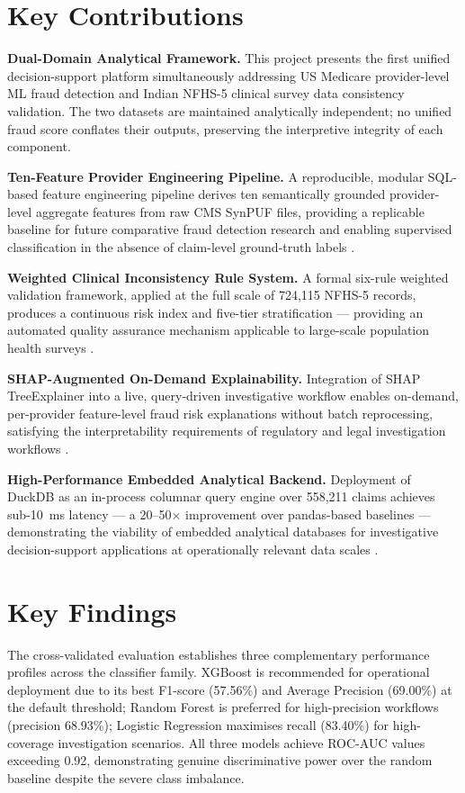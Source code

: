 \section{Key Contributions}

\textbf{Dual-Domain Analytical Framework.} This project presents the first unified decision-support platform simultaneously addressing US Medicare provider-level ML fraud detection and Indian NFHS-5 clinical survey data consistency validation. The two datasets are maintained analytically independent; no unified fraud score conflates their outputs, preserving the interpretive integrity of each component.

\textbf{Ten-Feature Provider Engineering Pipeline.} A reproducible, modular SQL-based feature engineering pipeline derives ten semantically grounded provider-level aggregate features from raw CMS SynPUF files, providing a replicable baseline for future comparative fraud detection research and enabling supervised classification in the absence of claim-level ground-truth labels \cite{b17}.

\textbf{Weighted Clinical Inconsistency Rule System.} A formal six-rule weighted validation framework, applied at the full scale of 724,115 NFHS-5 records, produces a continuous risk index and five-tier stratification --- providing an automated quality assurance mechanism applicable to large-scale population health surveys \cite{b14}\cite{b15}.

\textbf{SHAP-Augmented On-Demand Explainability.} Integration of SHAP TreeExplainer \cite{b6} into a live, query-driven investigative workflow enables on-demand, per-provider feature-level fraud risk explanations without batch reprocessing, satisfying the interpretability requirements of regulatory and legal investigation workflows \cite{b7}\cite{b8}.

\textbf{High-Performance Embedded Analytical Backend.} Deployment of DuckDB as an in-process columnar query engine over 558,211 claims achieves sub-10~ms latency --- a 20--50$\times$ improvement over pandas-based baselines --- demonstrating the viability of embedded analytical databases for investigative decision-support applications at operationally relevant data scales \cite{b18}.

\section{Key Findings}

The cross-validated evaluation establishes three complementary performance profiles across the classifier family. XGBoost is recommended for operational deployment due to its best F1-score (57.56\%) and Average Precision (69.00\%) at the default threshold; Random Forest is preferred for high-precision workflows (precision 68.93\%); Logistic Regression maximises recall (83.40\%) for high-coverage investigation scenarios. All three models achieve ROC-AUC values exceeding 0.92, demonstrating genuine discriminative power over the random baseline despite the severe class imbalance.

